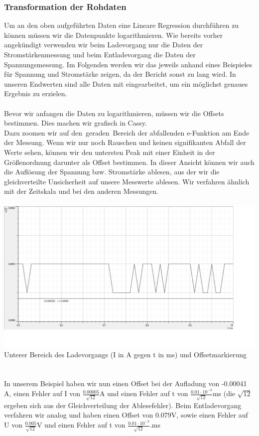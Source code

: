 \documentclass[12pt,a4paper]{article}
\begin{document}
\subsubsection{Transformation der Rohdaten}
Um an den oben aufgeführten Daten eine Lineare Regression durchführen zu können müssen wir die Datenpunkte logarithmieren. Wie bereits vorher angekündigt verwenden wir beim Ladevorgang nur die Daten der Stromstärkenmessung und beim Entladevorgang die Daten der Spannungsmessung. Im Folgenden werden wir das jeweils anhand eines Beispieles für Spannung und Stromstärke zeigen, da der Bericht sonst zu lang wird. In unseren Endwerten sind alle Daten mit eingearbeitet, um ein möglichst genaues Ergebnis zu erzielen.\\
\\Bevor wir anfangen die Daten zu logarithmieren, müssen wir die Offsets bestimmen. Dies machen wir grafisch in Cassy.\\
Dazu zoomen wir auf den $\,$geraden$\,$ Bereich der abfallenden e-Funktion am Ende der Messung. Wenn wir nur noch Rauschen und keinen signifikanten Abfall der Werte sehen, können wir den untersten Peak mit einer Einheit in der Größenordnung darunter als Offset bestimmen. In dieser Ansicht können wir auch die Auflösung der Spannung bzw. Stromstärke ablesen, aus der wir die gleichverteilte Unsicherheit auf unsere Messwerte ablesen. Wir verfahren ähnlich mit der Zeitskala und bei den anderen Messungen.\\
\\
\includegraphics[scale=0.35]{offset_und_fehler.png}\\
Unterer Bereich des Ladevorgangs (I in A gegen t in ms) und Offsetmarkierung\\
\\
\\In unserem Beispiel haben wir nun einen Offset bei der Aufladung von -0.00041 A, einen Fehler auf I von $\frac{0.00005}{\sqrt{12}}$A und einen Fehler auf t von $\frac{0.01\cdot10^{-3}}{\sqrt{12}}$ms (die $\sqrt{12}$ ergeben sich aus der Gleichverteilung der Ablesefehler). Beim Entladevorgang verfahren wir analog und haben einen Offset von 0.079V, sowie einen Fehler auf U von $\frac{0.005}{\sqrt{12}}$V und einen Fehler auf t von $\frac{0.01\cdot10^{-3}}{\sqrt{12}}$.ms\\
\end{document}
